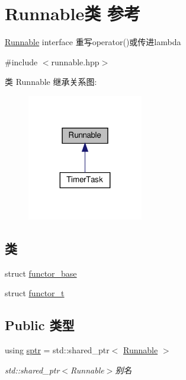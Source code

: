 \hypertarget{classRunnable}{}\section{Runnable类 参考}
\label{classRunnable}


\hyperlink{classRunnable}{Runnable} interface 重写operator()或传进lambda  




{\ttfamily \#include $<$runnable.\+hpp$>$}



类 Runnable 继承关系图\+:\nopagebreak
\begin{figure}[H]
\begin{center}
\leavevmode
\includegraphics[width=143pt]{classRunnable__inherit__graph}
\end{center}
\end{figure}
\subsection*{类}
\begin{DoxyCompactItemize}
\item 
struct \hyperlink{structRunnable_1_1functor__base}{functor\+\_\+base}
\item 
struct \hyperlink{structRunnable_1_1functor__t}{functor\+\_\+t}
\end{DoxyCompactItemize}
\subsection*{Public 类型}
\begin{DoxyCompactItemize}
\item 
\mbox{\label{classRunnable_abe8d3066c7305401d6f0aad8e70780f2}} 
using \hyperlink{classRunnable_abe8d3066c7305401d6f0aad8e70780f2}{sptr} = std\+::shared\+\_\+ptr$<$ \hyperlink{classRunnable}{Runnable} $>$
\begin{DoxyCompactList}\small\item\em std\+::shared\+\_\+ptr$<$\+Runnable$>$别名 \end{DoxyCompactList}\end{DoxyCompactItemize}
